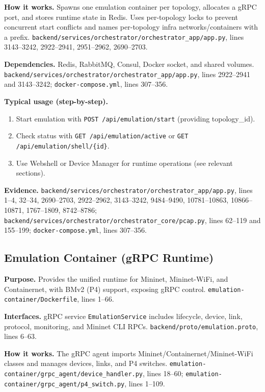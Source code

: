 \documentclass[10pt,a4paper]{article}
\begin{document}
\textbf{How it works.} Spawns one emulation container per topology, allocates a gRPC port, and stores runtime state in Redis. Uses per-topology locks to prevent concurrent start conflicts and names per-topology infra networks/containers with a prefix. \texttt{backend/services/orchestrator/orchestrator\_app/app.py}, lines 3143--3242, 2922--2941, 2951--2962, 2690--2703.

\textbf{Dependencies.} Redis, RabbitMQ, Consul, Docker socket, and shared volumes. \texttt{backend/services/orchestrator/orchestrator\_app/app.py}, lines 2922--2941 and 3143--3242; \texttt{docker-compose.yml}, lines 307--356.

\textbf{Typical usage (step-by-step).}
\begin{enumerate}[leftmargin=*]
\item Start emulation with \texttt{POST /api/emulation/start} (providing topology\_id).
\item Check status with \texttt{GET /api/emulation/active} or \texttt{GET /api/emulation/shell/\{id\}}.
\item Use Webshell or Device Manager for runtime operations (see relevant sections).
\end{enumerate}

\textbf{Evidence.} \texttt{backend/services/orchestrator/orchestrator\_app/app.py}, lines 1--4, 32--34, 2690--2703, 2922--2962, 3143--3242, 9484--9490, 10781--10863, 10866--10871, 1767--1809, 8742--8786; \texttt{backend/services/orchestrator/orchestrator\_core/pcap.py}, lines 62--119 and 155--199; \texttt{docker-compose.yml}, lines 307--356.

\subsection{Emulation Container (gRPC Runtime)}

\textbf{Purpose.} Provides the unified runtime for Mininet, Mininet-WiFi, and Containernet, with BMv2 (P4) support, exposing gRPC control. \texttt{emulation-container/Dockerfile}, lines 1--66.

\textbf{Interfaces.} gRPC service \texttt{EmulationService} includes lifecycle, device, link, protocol, monitoring, and Mininet CLI RPCs. \texttt{backend/proto/emulation.proto}, lines 6--63.

\textbf{How it works.} The gRPC agent imports Mininet/Containernet/Mininet-WiFi classes and manages devices, links, and P4 switches. \texttt{emulation-container/grpc\_agent/device\_handler.py}, lines 18--60; \texttt{emulation-container/grpc\_agent/p4\_switch.py}, lines 1--109.
\end{document}
